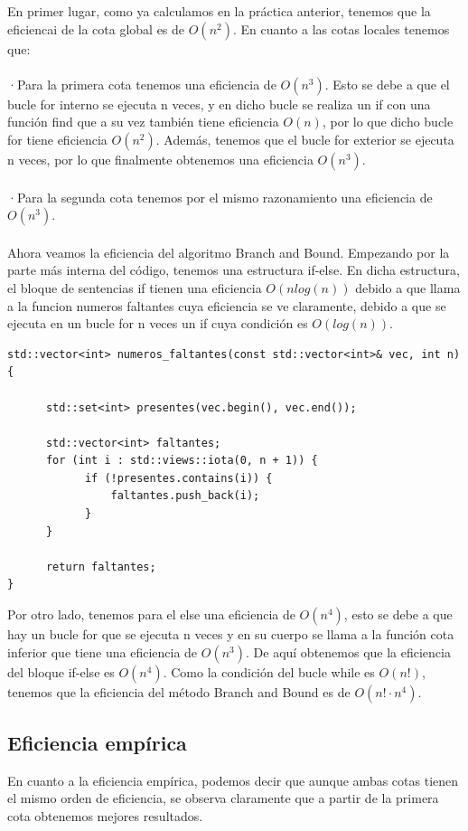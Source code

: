 \documentclass[11pt,openany]{book}
\begin{document}
En primer lugar, como ya calculamos en la práctica anterior, tenemos que la eficiencai de la cota global es de $O(n^2)$. En cuanto a las cotas locales tenemos
que: \\\\
·Para la primera cota tenemos una eficiencia de $O(n^3)$. Esto se debe a que el bucle for interno se ejecuta n veces, y en dicho bucle se realiza un if con 
una función find que a su vez también tiene eficiencia $O(n)$, por lo que dicho bucle for tiene eficiencia $O(n^2)$. Además, tenemos que el bucle for exterior 
se ejecuta n veces, por lo que finalmente obtenemos una eficiencia $O(n^3)$.\\\\
·Para la segunda cota tenemos por el mismo razonamiento una eficiencia de $O(n^3)$.\\\\
Ahora veamos la eficiencia del algoritmo Branch and Bound. Empezando por la parte más interna del código, tenemos una estructura if-else. En dicha estructura,
el bloque de sentencias if tienen una eficiencia $O(nlog(n))$ debido a que llama a la funcion numeros faltantes cuya eficiencia se ve claramente, debido a que 
se ejecuta en un bucle for n veces un if cuya condición es $O(log(n))$.
\begin{lstlisting}
std::vector<int> numeros_faltantes(const std::vector<int>& vec, int n) {
            
      std::set<int> presentes(vec.begin(), vec.end());
        
      std::vector<int> faltantes;
      for (int i : std::views::iota(0, n + 1)) {
            if (!presentes.contains(i)) {
                faltantes.push_back(i);
            }
      }
        
      return faltantes;
}
\end{lstlisting}
Por otro lado, tenemos para el else una eficiencia de $O(n^4)$, esto se debe a que hay un bucle for que se ejecuta n veces y en su cuerpo se llama a la función 
cota inferior que tiene una eficiencia de $O(n^3)$. De aquí obtenemos que la eficiencia del bloque if-else es $O(n^4)$. Como la condición del bucle while es $O(n!)$,
tenemos que la eficiencia del método Branch and Bound es de $O(n! \cdot n^4 )$. 

\subsection{Eficiencia empírica}
En cuanto a la eficiencia empírica, podemos decir que aunque ambas cotas tienen el mismo orden de eficiencia, se observa
claramente que a partir de la primera cota obtenemos mejores resultados.
\end{document}
